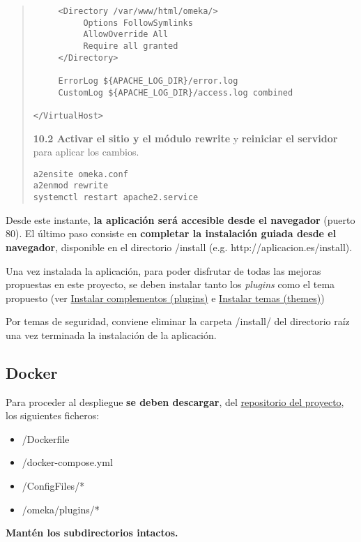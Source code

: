 \begin{enumerate}
\begin{quote}
\begin{verbatim}
     <Directory /var/www/html/omeka/>
          Options FollowSymlinks
          AllowOverride All
          Require all granted
     </Directory>

     ErrorLog ${APACHE_LOG_DIR}/error.log
     CustomLog ${APACHE_LOG_DIR}/access.log combined

</VirtualHost>
\end{verbatim}
\item
  \textbf{10.2 Activar el sitio y el módulo rewrite} y \textbf{reiniciar el
  servidor} para aplicar los cambios.
\begin{verbatim}
a2ensite omeka.conf
a2enmod rewrite
systemctl restart apache2.service
\end{verbatim}
\end{quote}
\end{enumerate}

Desde este instante, \textbf{la aplicación será accesible desde el
navegador} (puerto 80). El último paso consiste en \textbf{completar la
instalación guiada desde el navegador}, disponible en el directorio
{/install} (e.g. {http://aplicacion.es/install}).

Una vez instalada la aplicación, para poder disfrutar de todas las
mejoras propuestas en este proyecto, se deben instalar tanto los
\emph{plugins} como el tema propuesto (ver
\protect\hyperlink{instalar-complementos-plugins}{Instalar complementos
(plugins)} e \protect\hyperlink{instalar-temas-themes}{Instalar temas
(themes)})

Por temas de seguridad, conviene eliminar la carpeta {/install/} del
directorio raíz una vez terminada la instalación de la aplicación.

\subsection{Docker}

Para proceder al despliegue \textbf{se deben descargar}, del
\href{https://github.com/gcm1001/TFG-CeniehAriadne}{repositorio del
proyecto}, los siguientes ficheros:

\begin{itemize}
\tightlist
\item
  {/Dockerfile}
\item
  {/docker-compose.yml}
\item
  {/ConfigFiles/*}
\item
  {/omeka/plugins/*}
\end{itemize}

\textbf{Mantén los subdirectorios intactos.}

